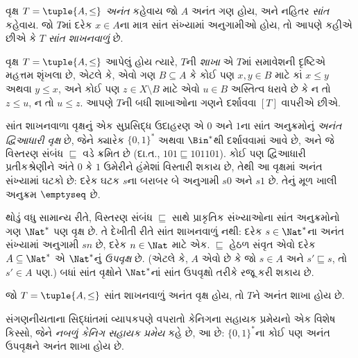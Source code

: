 \begin{defn}
વૃક્ષ $T = \tuple{A, \le}$ \emph{અનંત} કહેવાય જો $A$
અનંત ગણ હોય, અને નહિતર \emph{સાંત} કહેવાય.
જો $T$માં દરેક $x \in A$ના માત્ર સાંત સંખ્યામાં અનુગામીઓ હોય,
તો આપણે કહીએ છીએ કે $T$ \emph{સાંત શાખનવાળું} છે.
\end{defn}

\begin{defn}[શાખાઓ]
વૃક્ષ $T = \tuple{A, \le}$ આપેલું હોય ત્યારે,
$T$ની \emph{શાખા} એ $T$માં સમાવેશની દૃષ્ટિએ મહત્તમ શૃંખલા છે,
એટલે કે, એવો ગણ $B \subseteq A$ કે કોઈ પણ
$x, y \in B$ માટે કાં $x \le y$ અથવા $y \le x$,
અને કોઈ પણ $z \in X \setminus B$ માટે એવો
$u \in B$ અસ્તિત્વ ધરાવે છે કે ન તો $z \le u$, ન તો $u \le z$.
આપણે $T$ની બધી શાખાઓના ગણને દર્શાવવા $[T]$ વાપરીએ છીએ.
\end{defn}

\begin{ex}
સાંત શાખનવાળા વૃક્ષનું એક સુપ્રસિદ્ધ ઉદાહરણ એ $0$ અને $1$ના
સાંત અનુક્રમોનું \emph{અનંત દ્વિઆધારી વૃક્ષ} છે,
જેને ક્યારેક $\{0,1\}^*$ અથવા $\Bin^*$થી દર્શાવવામાં આવે છે,
અને જે વિસ્તરણ સંબંધ $\sqsubseteq$ વડે ક્રમિત છે
(દા.ત., $101 \sqsubseteq 101101$).
કોઈ પણ દ્વિઆધારી પ્રતીકશ્રેણીને અંતે $0$ કે $1$ ઉમેરીને
હંમેશાં વિસ્તારી શકાય છે, તેથી આ વૃક્ષમાં અનંત સંખ્યામાં
ઘટકો છે: દરેક ઘટક $s$ના બરાબર બે અનુગામી $s0$ અને $s1$ છે.
તેનું મૂળ ખાલી અનુક્રમ $\emptyseq$ છે.
\end{ex}

\begin{ex}
થોડું વધુ સામાન્ય રીતે, વિસ્તરણ સંબંધ $\sqsubseteq$ સાથે
પ્રાકૃતિક સંખ્યાઓના સાંત અનુક્રમોનો ગણ $\Nat^*$ પણ વૃક્ષ છે.
તે દેખીતી રીતે સાંત શાખનવાળું નથી: દરેક $s \in \Nat^*$ના
અનંત સંખ્યામાં અનુગામી $sn$ છે, દરેક $n \in \Nat$ માટે એક.
$\sqsubseteq$ હેઠળ સંવૃત એવો દરેક $A \subseteq \Nat^*$
એ $\Nat^*$નું \emph{ઉપવૃક્ષ} છે.
(એટલે કે, $A$ એવો છે કે જો $s \in A$ અને
$s' \sqsubseteq s$, તો $s' \in A$ પણ.)
બધાં સાંત વૃક્ષોને $\Nat^*$નાં સાંત ઉપવૃક્ષો તરીકે રજૂ કરી શકાય છે.
\end{ex}

\begin{prop}[કેનિગનું સહાયક પ્રમેય]
જો $T = \tuple{A,\le}$ સાંત શાખનવાળું અનંત વૃક્ષ હોય,
તો $T$ને અનંત શાખા હોય છે.
\end{prop}

સંગણનીયતાના સિદ્ધાંતમાં વ્યાપકપણે વપરાતો કેનિગના સહાયક
પ્રમેયનો એક વિશેષ કિસ્સો, જેને \emph{નબળું કેનિગ સહાયક પ્રમેય}
કહે છે, આ છે: $\{0,1\}^*$ના કોઈ પણ અનંત ઉપવૃક્ષને
અનંત શાખા હોય છે.
\endgroup


\begingroup
\makeatletter{}\makeatother


